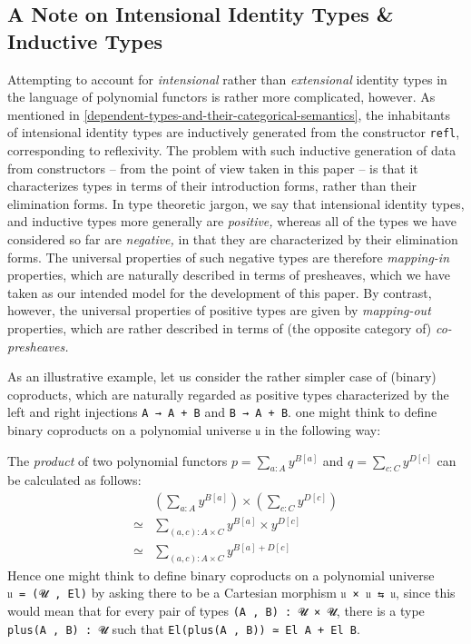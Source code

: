 \documentclass[
  11pt,
  oneside,
  article]{memoir}
\theoremstyle{definition}
\theoremstyle{plain}
\newcommand{\0}{\textsf{0}}
\newcommand{\1}{\tn{\textsf{1}}}
\begin{document}
\subsection{A Note on Intensional Identity Types \& Inductive
Types}\label{a-note-on-intensional-identity-types-inductive-types}

Attempting to account for \emph{intensional} rather than
\emph{extensional} identity types in the language of polynomial functors
is rather more complicated, however. As mentioned in \cref{dependent-types-and-their-categorical-semantics}, the
inhabitants of intensional identity types are inductively generated from
the constructor \texttt{refl}, corresponding to reflexivity. The problem
with such inductive generation of data from constructors -- from the
point of view taken in this paper -- is that it characterizes types in
terms of their introduction forms, rather than their elimination forms.
In type theoretic jargon, we say that intensional identity types, and
inductive types more generally are \emph{positive,} whereas all of the
types we have considered so far are \emph{negative,} in that they are
characterized by their elimination forms. The universal properties of
such negative types are therefore \emph{mapping-in} properties, which
are naturally described in terms of presheaves, which we have taken as
our intended model for the development of this paper. By contrast,
however, the universal properties of positive types are given by
\emph{mapping-out} properties, which are rather described in terms of
(the opposite category of) \emph{co-presheaves.}

As an illustrative example, let us consider the rather simpler case of
(binary) coproducts, which are naturally regarded as positive types
characterized by the left and right injections \texttt{A\ →\ A\ +\ B}
and \texttt{B\ →\ A\ +\ B}. one might think to define binary coproducts
on a polynomial universe \texttt{𝔲} in the following way:

The \emph{product} of two polynomial functors
\(p = \sum_{a : A} y^{B[a]}\) and \(q = \sum_{c : C} y^{D[c]}\) can be
calculated as follows: \[
\begin{array}{rl} & \left( \sum_{a : A} y^{B[a]} \right) \times \left( \sum_{c : C} y^{D[c]} \right)\\
\simeq & \sum_{(a , c) : A \times C} y^{B[a]} \times y^{D[c]}\\
\simeq & \sum_{(a , c) : A \times C} y^{B[a] + D[c]}
\end{array}
\] Hence one might think to define binary coproducts on a polynomial
universe \texttt{𝔲\ =\ (𝓤\ ,\ El)} by asking there to be a Cartesian
morphism \texttt{𝔲\ ×\ 𝔲\ ⇆\ 𝔲}, since this would mean that for every
pair of types \texttt{(A\ ,\ B)\ :\ 𝓤\ ×\ 𝓤}, there is a type
\texttt{plus(A\ ,\ B)\ :\ 𝓤} such that
\texttt{El(plus(A\ ,\ B))\ ≃\ El\ A\ +\ El\ B}.
\end{document}

